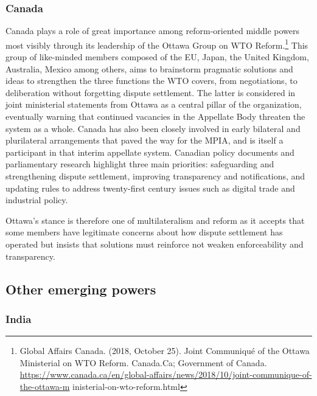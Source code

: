 \subsubsection{Canada}

Canada plays a role of great importance among reform-oriented middle powers most visibly through its leadership of the Ottawa Group on WTO Reform.\footnote{Global Affairs Canada. (2018, October 25). Joint Communiqué of the Ottawa Ministerial on WTO Reform. Canada.Ca; Government of Canada. \url{https://www.canada.ca/en/global-affairs/news/2018/10/joint-communique-of-the-ottawa-m} inisterial-on-wto-reform.html} This group of like-minded members composed of the EU, Japan, the United Kingdom, Australia, Mexico among others, aims to brainstorm pragmatic solutions and ideas to strengthen the three functions the WTO covers, from negotiations, to deliberation without forgetting dispute settlement. The latter is considered in joint ministerial statements from Ottawa as a central pillar of the organization, eventually warning that continued vacancies in the Appellate Body threaten the system as a whole. Canada has also been closely involved in early bilateral and plurilateral arrangements that paved the way for the MPIA, and is itself a participant in that interim appellate system. Canadian policy documents and parliamentary research highlight three main priorities: safeguarding and strengthening dispute settlement, improving transparency and notifications, and updating rules to address twenty-first century issues such as digital trade and industrial policy.

Ottawa’s stance is therefore one of multilateralism and reform as it accepts that some members have legitimate concerns about how dispute settlement has operated but insists that solutions must reinforce not weaken enforceability and transparency.

\subsection{Other emerging powers}

\subsubsection{India}

